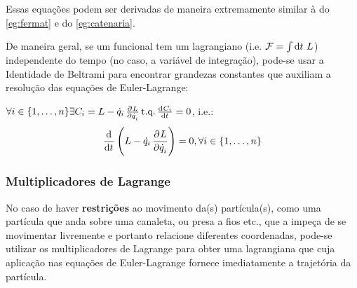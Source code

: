 Essas equações podem ser derivadas de maneira extremamente similar à do
\autoref{eg:fermat} e do \autoref{eg:catenaria}. 

De maneira geral, se um funcional tem um lagrangiano (i.e. $\mathcal{F}=\int
\dif t~L$) independente do tempo (no caso, a variável de integração), pode-se
usar a Identidade de Beltrami para encontrar grandezas constantes que auxiliam
a resolução das equações de Euler-Lagrange:

\begin{namedeq}
    $\forall i \in \{1, \ldots, n\} \exists C_i = L - \dot q_i \tpd{L}{\dot
    q_i} \text{t.q.} \tod{C_i}{t} = 0$, i.e.:
    \begin{equation*}
        \label{eq:beltrami}
        \dod{}{t} \del{L - \dot q_i \dpd{L}{\dot q_i}} = 0, \forall i \in \{1, 
        \ldots, n\}
    \end{equation*}
\end{namedeq}

\subsubsection{Multiplicadores de Lagrange}
\label{sssec:lagrange_multipliers}

No caso de haver \textbf{restrições} ao movimento da(s) partícula(s), como uma
partícula que anda sobre uma canaleta, ou presa a fios etc., que a impeça de se
movimentar livremente e portanto relacione diferentes coordenadas, pode-se
utilizar os multiplicadores de Lagrange para obter uma lagrangiana que cuja
aplicação nas equações de Euler-Lagrange fornece imediatamente a trajetória da
partícula.

